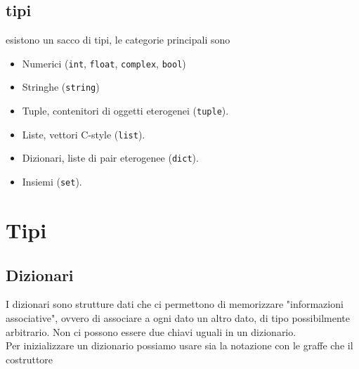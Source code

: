 \documentclass[11pt]{scrartcl}
\begin{document}
	\subsection{tipi}
	esistono un sacco di tipi, le categorie principali sono
	\begin{itemize}
		\item Numerici (\verb|int|, \verb*|float|, \verb*|complex|, \verb*|bool|)
		\item Stringhe (\verb*|string|)
		\item Tuple, contenitori di oggetti eterogenei (\verb*|tuple|).
		\item Liste, vettori C-style (\verb*|list|).
		\item Dizionari, liste di pair eterogenee (\verb*|dict|).
		\item Insiemi (\verb*|set|).
	\end{itemize}
	
	\section{Tipi}
	
	\subsection{Dizionari}
	
	I dizionari sono strutture dati che ci permettono di memorizzare "informazioni associative", ovvero di associare a ogni dato un altro dato, di tipo possibilmente arbitrario. Non ci possono essere due chiavi uguali in un dizionario.\\
	Per inizializzare un dizionario possiamo usare sia la notazione con le graffe che il costruttore
	
\end{document}
